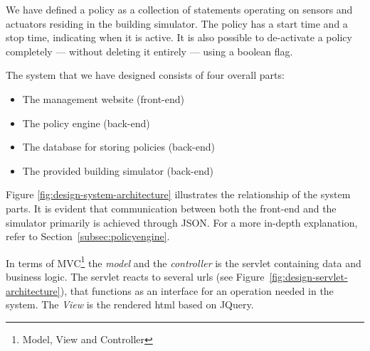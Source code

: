 We have defined a policy as a collection of statements operating on sensors and actuators residing in the building simulator. The policy has a start time and a stop time, indicating when it is active. It is also possible to de-activate a policy completely --- without deleting it entirely --- using a boolean flag.

The system that we have designed consists of four overall parts:
\begin{itemize}
	\item The management website (front-end)
	\item The policy engine (back-end)
	\item The database for storing policies (back-end)
	\item The provided building simulator (back-end)
\end{itemize}

Figure \ref{fig:design-system-architecture} illustrates the relationship of the system parts. It is evident that communication between both the front-end and the simulator primarily is achieved through JSON. For a more in-depth explanation, refer to Section~\ref{subsec:policyengine}.

In terms of MVC\footnote{Model, View and Controller} the \textit{model} and the \textit{controller} is the servlet containing data and business logic. The servlet reacts to several urls (see Figure~\ref{fig:design-servlet-architecture}), that functions as an interface for an operation needed in the system. The \textit{View} is the rendered html based on JQuery.

\begin{figure}[t]
\end{figure}

